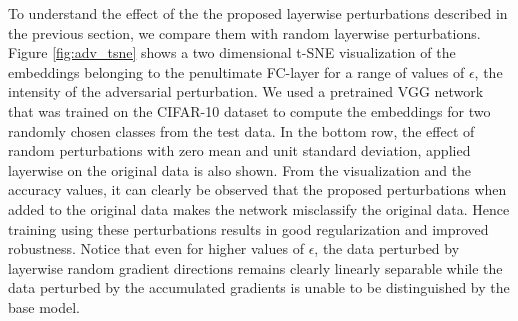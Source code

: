 
To understand the effect of the the proposed layerwise perturbations described in the previous section, we compare them with random layerwise perturbations. Figure \ref{fig:adv_tsne} shows a two dimensional t-SNE \cite{maaten2008visualizing} visualization of the embeddings belonging to the penultimate FC-layer for a range of values of $\epsilon$, the intensity of the adversarial perturbation. 
We used a pretrained VGG network that was trained on the CIFAR-10 dataset to compute the embeddings for two randomly chosen classes from the test data. In the bottom row, the effect of random perturbations with zero mean and unit standard deviation, applied layerwise on the original data is also shown. From the visualization and the accuracy values, it can clearly be observed that the proposed perturbations when added to the original data makes the network misclassify the original data. Hence training using these perturbations results in good regularization and improved robustness. Notice that even for higher values of $\epsilon$, the data perturbed by layerwise random gradient directions remains clearly linearly separable while the data perturbed by the accumulated gradients is unable to be distinguished by the base model. 


